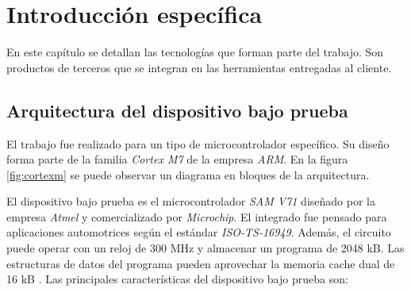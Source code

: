 \chapter{Introducción específica}

\label{Chapter2}

En este capítulo se detallan las tecnologías que forman parte del trabajo.
Son productos de terceros que se integran en las herramientas entregadas al cliente.

\section{Arquitectura del dispositivo bajo prueba}
\label{sec:dut}

El trabajo fue realizado para un tipo de microcontrolador específico.
Su diseño forma parte de la familia \emph{Cortex M7} de la empresa \emph{ARM}.
En la figura \ref{fig:cortexm} se puede observar un diagrama en bloques de la arquitectura.

El dispositivo bajo prueba es el microcontrolador \emph{SAM V71} diseñado por la empresa \emph{Atmel} y comercializado por \emph{Microchip}.
El integrado fue pensado para aplicaciones automotrices según el estándar \emph{ISO-TS-16949}.
Además, el circuito puede operar con un reloj de 300 MHz y almacenar un programa de 2048 kB.
Las estructuras de datos del programa pueden aprovechar la memoria cache dual de 16 kB \citep{ARTICLE:dutdatasheet}.
Las principales características del dispositivo bajo prueba son:


